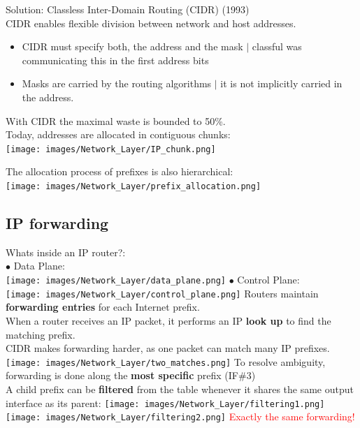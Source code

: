 \documentclass[a4paper, fontsize=8pt, landscape, DIV=1]{scrartcl}
\begin{document}
\begin{multicols*}{4}
   		Solution: Classless Inter-Domain Routing (CIDR) (1993)\\
   		CIDR enables flexible division between network and host addresses. 
   		\begin{itemize}[noitemsep]
   			\item CIDR must specify both, the address and the mask $\vert$ classful was communicating this in the first address bits
   			\item Masks are carried by the routing algorithms $\vert$ it is not implicitly carried in the address.  
   		\end{itemize}
   		With CIDR the maximal waste is bounded to 50\%.\\
   		Today, addresses are allocated in contiguous chunks:\\ 
   		\texttt{[image: images/Network\_Layer/IP\_chunk.png]}
   		\pagebreak
   		
   		The allocation process of prefixes is also hierarchical:\\
   		\texttt{[image: images/Network\_Layer/prefix\_allocation.png]}
   		
   		\subsection{IP forwarding}
   		Whats inside an IP router?:\\
   		$\bullet$ Data Plane:\\
   		\texttt{[image: images/Network\_Layer/data\_plane.png]}
   		$\bullet$ Control Plane:\\
   		\texttt{[image: images/Network\_Layer/control\_plane.png]}
   		Routers maintain \textbf{forwarding entries} for each Internet prefix.\\
   		When a router receives an IP packet, it performs an IP \textbf{look up} to find the matching prefix.\\
   		CIDR makes forwarding harder, as one packet can match many IP prefixes.\\
   		\texttt{[image: images/Network\_Layer/two\_matches.png]}
   		To resolve ambiguity, forwarding is done along the \textbf{most specific} prefix (IF\#3)\\
   		A child prefix can be \textbf{filtered} from the table whenever it shares the same output interface as its parent:
   		\texttt{[image: images/Network\_Layer/filtering1.png]}
   		\texttt{[image: images/Network\_Layer/filtering2.png]}
   		\textcolor{Red}{Exactly the same forwarding!}
   		

\end{multicols*}
\end{document}
